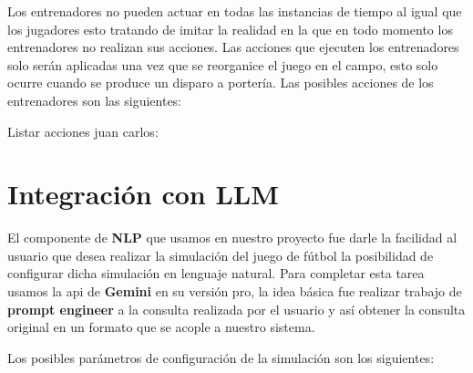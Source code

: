 \documentclass{article}
\begin{document}
Los entrenadores no pueden actuar en todas las instancias de tiempo al igual que los jugadores esto tratando de imitar la realidad
en la que en todo momento los entrenadores no realizan sus acciones. Las acciones que ejecuten los entrenadores solo
serán aplicadas una vez que se reorganice el juego en el campo, esto solo ocurre cuando se produce un disparo a portería.
Las posibles acciones de los entrenadores son las siguientes:

Listar acciones juan carlos:


\section{Integración con LLM}

El componente de \textbf{NLP} que usamos en nuestro proyecto fue darle la facilidad al usuario que desea realizar la simulación del 
juego de fútbol la posibilidad de configurar dicha simulación en lenguaje natural. Para completar esta tarea usamos la api de \textbf{Gemini}
en su versión pro, la idea básica fue realizar trabajo de \textbf{prompt engineer} a la consulta realizada por el usuario y así obtener
la consulta original en un formato que se acople a nuestro sistema.

Los posibles parámetros de configuración de la simulación son los siguientes:
\end{document}

